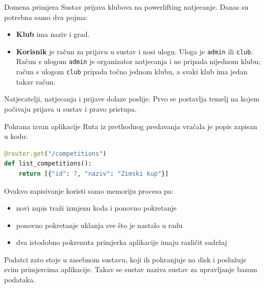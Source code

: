 \begin{frame}{Domena primjera}
Sustav prijava klubova na powerlifting natjecanje. Danas su potrebna samo dva pojma:

\begin{itemize}
  \item \textbf{Klub} ima naziv i grad.
  \item \textbf{Korisnik} je račun za prijavu u sustav i nosi ulogu. Uloga je \texttt{admin} ili \texttt{club}. Račun s ulogom \texttt{admin} je organizator natjecanja i ne pripada nijednom klubu; račun s ulogom \texttt{club} pripada točno jednom klubu, a svaki klub ima jedan takav račun.
\end{itemize}

\vspace{0.4em}
Natjecatelji, natjecanja i prijave dolaze poslije. Prvo se postavlja temelj na kojem počivaju prijava u sustav i pravo pristupa.
\end{frame}


\begin{frame}[fragile]{Pohrana izvan aplikacije}
Ruta iz prethodnog predavanja vraćala je popis zapisan u kodu:

\begin{lstlisting}[language=python]
@router.get("/competitions")
def list_competitions():
    return [{"id": 7, "naziv": "Zimski kup"}]
\end{lstlisting}

\vspace{0.4em}
Ovakvo zapisivanje koristi samo memoriju procesa pa:

\begin{itemize}
  \item novi zapis traži izmjenu koda i ponovno pokretanje
  \item ponovno pokretanje uklanja sve što je nastalo u radu
  \item dva istodobno pokrenuta primjerka aplikacije imaju različit sadržaj
\end{itemize}

\vspace{0.3em}
Podatci zato stoje u zasebnom sustavu, koji ih pohranjuje na disk i poslužuje svim primjercima aplikacije. Takav se sustav naziva sustav za upravljanje bazom podataka.
\end{frame}

